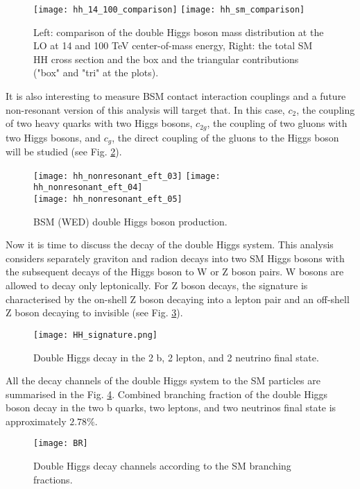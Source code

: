 \begin{figure}[H]
  \centering 
    \texttt{[image: hh\_14\_100\_comparison]}
    \texttt{[image: hh\_sm\_comparison]}
    \caption{Left: comparison of the double Higgs boson mass distribution at the LO at 14 and 100 TeV center-of-mass energy, Right: the total SM HH cross section and the box and the triangular contributions ("box" and "tri" at the plots).}
    \label{hh_comparison}
\end{figure}


It is also interesting to measure BSM contact interaction couplings and a future non-resonant version of this analysis will target that. In this case, $c_2$, the coupling of two heavy quarks with two Higgs bosons, $c_{2g}$, the coupling of two gluons with two Higgs bosons, and $c_g$, the direct coupling of the gluons to the Higgs boson will be studied (see Fig. \ref{BSM_HH}). 

\begin{figure}[H]
  \centering
    \texttt{[image: hh\_nonresonant\_eft\_03]}
    \texttt{[image: hh\_nonresonant\_eft\_04]}\\
     \texttt{[image: hh\_nonresonant\_eft\_05]}
    \caption{BSM (WED) double Higgs boson production.}
    \label{BSM_HH}
\end{figure}


Now it is time to discuss the decay of the double Higgs system. 
This analysis considers separately graviton and radion decays into two SM Higgs bosons with the subsequent decays of the Higgs boson to W or Z boson pairs. W bosons are allowed to decay only leptonically. For Z boson decays, the signature is characterised by the on-shell Z boson decaying into a lepton pair and an off-shell Z boson decaying to invisible (see Fig. \ref{HH_signature}). 

\begin{figure}[H]
  \centering
    \texttt{[image: HH\_signature.png]}
    \caption{Double Higgs decay in the 2 b, 2 lepton, and 2 neutrino final state. }
    \label{HH_signature}
\end{figure}

All the decay channels of the double Higgs system to the SM particles are summarised in the Fig. \ref{BR}. Combined branching fraction of the double Higgs boson decay in the two b quarks, two leptons, and two neutrinos final state is approximately $2.78 \%$. 

\begin{figure}[H]
  \centering
    \texttt{[image: BR]}
    \caption{Double Higgs decay channels according to the SM branching fractions.}
    \label{BR}
\end{figure}



